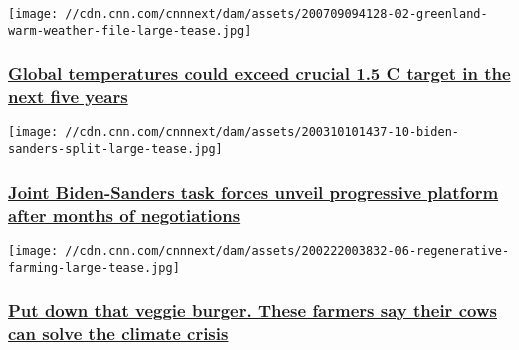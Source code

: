 \href{/2020/07/09/world/global-temperatures-wmo-climate-intl-scli/index.html}{}

\texttt{[image: //cdn.cnn.com/cnnnext/dam/assets/200709094128-02-greenland-warm-weather-file-large-tease.jpg]}

\hypertarget{global-temperatures-could-exceed-crucial-15-c-target-in-the-next-five-years}{%
\subsubsection{\texorpdfstring{\href{/2020/07/09/world/global-temperatures-wmo-climate-intl-scli/index.html}{Global
temperatures could exceed crucial 1.5 C target in the next five
years}}{Global temperatures could exceed crucial 1.5 C target in the next five years}}\label{global-temperatures-could-exceed-crucial-15-c-target-in-the-next-five-years}}

\href{/2020/07/08/politics/joe-biden-bernie-sanders-task-force-recommendations/index.html}{}

\texttt{[image: //cdn.cnn.com/cnnnext/dam/assets/200310101437-10-biden-sanders-split-large-tease.jpg]}

\hypertarget{joint-biden-sanders-task-forces-unveil-progressive-platform-after-months-of-negotiations}{%
\subsubsection{\texorpdfstring{\href{/2020/07/08/politics/joe-biden-bernie-sanders-task-force-recommendations/index.html}{Joint
Biden-Sanders task forces unveil progressive platform after months of
negotiations}}{Joint Biden-Sanders task forces unveil progressive platform after months of negotiations}}\label{joint-biden-sanders-task-forces-unveil-progressive-platform-after-months-of-negotiations}}

\href{/2020/03/06/africa/agriculture-regenerative-farming-climate-crisis-intl/index.html}{}

\texttt{[image: //cdn.cnn.com/cnnnext/dam/assets/200222003832-06-regenerative-farming-large-tease.jpg]}

\hypertarget{put-down-that-veggie-burger-these-farmers-say-their-cows-can-solve-the-climate-crisis}{%
\subsubsection{\texorpdfstring{\href{/2020/03/06/africa/agriculture-regenerative-farming-climate-crisis-intl/index.html}{Put
down that veggie burger. These farmers say their cows can solve the
climate
crisis}}{Put down that veggie burger. These farmers say their cows can solve the climate crisis}}\label{put-down-that-veggie-burger-these-farmers-say-their-cows-can-solve-the-climate-crisis}}

